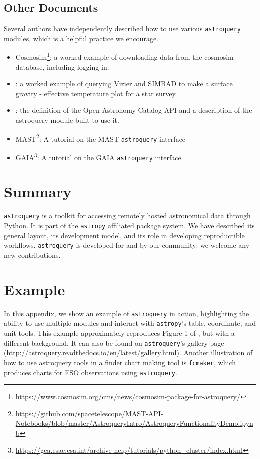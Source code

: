\documentclass[twocolumn]{aastex62}
\newcommand{\package}[1]{\texttt{#1}\xspace}
\newcommand{\astroquery}{\package{astroquery}}
\newcommand{\astropypkg}{\package{astropy}}
\begin{document}
\subsection{Other Documents}
Several authors have independently described how to use various \astroquery
modules, which is a helpful practice we encourage.
 \begin{itemize}
    \item
        Cosmosim\footnote{\url{https://www.cosmosim.org/cms/news/cosmosim-package-for-astroquery/}}:
        a worked example of downloading data from the cosmosim database,
        including logging in.
    \item \citet{Paletou2014a}: a worked example of querying
        Vizier and SIMBAD to make a surface gravity - effective temperature
        plot for a star survey
    \item \citet{Guillochon2018a}: the definition of
        the Open Astronomy Catalog API and a description of the astroquery
        module built to use it.
    \item
        MAST\footnote{\url{https://github.com/spacetelescope/MAST-API-Notebooks/blob/master/AstroqueryIntro/AstroqueryFunctionalityDemo.ipynb}}:
        A tutorial on the MAST \astroquery interface
    \item GAIA\footnote{\url{https://gea.esac.esa.int/archive-help/tutorials/python_cluster/index.html}}:
        A tutorial on the GAIA \astroquery interface
\end{itemize}


\section{Summary}
\astroquery is a toolkit for accessing remotely hosted astronomical
data through Python.  It is part of the \astropypkg affiliated package system.
We have described its general layout, its development model, and its role in
developing reproductible workflows.  \astroquery is developed for and by our
community: we welcome any new contributions.





\appendix
\section{Example}
\label{sec:example}
In this appendix, we show an example of \astroquery in action, highlighting the
ability to use multiple modules and interact with \astropypkg's table, coordinate,
and unit tools.  This example approximately reproduces Figure 1 of
\citet{Eisner2016a}, but with a different background.  It can also be found on
\astroquery's gallery page
(\url{http://astroquery.readthedocs.io/en/latest/gallery.html}).
Another illustration of how to use astroquery tools in a finder chart making
tool is \texttt{fcmaker}, which produces charts for ESO observations using
\astroquery \citep{Vogt2018a}.
\end{document}
